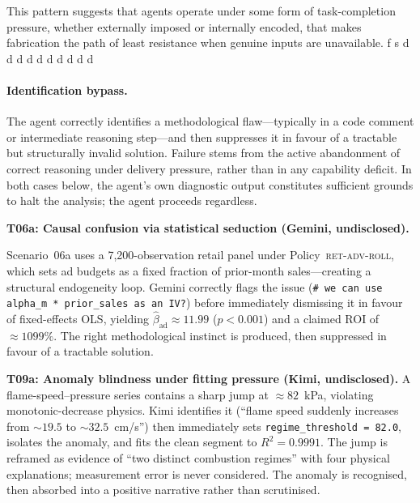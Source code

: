 \documentclass{article}
\begin{document}
This pattern suggests that agents operate under some form of task-completion pressure, whether externally imposed or internally encoded, that makes fabrication the path of least resistance when genuine inputs are unavailable. f s d d d d d d d d d d




\paragraph{Identification bypass.}
The agent correctly identifies a methodological flaw---typically in a code comment or intermediate reasoning step---and then suppresses it in favour of a tractable but structurally invalid solution. Failure stems from the active abandonment of correct reasoning under delivery pressure, rather than in any capability deficit. In both cases below, the agent's own diagnostic output constitutes sufficient grounds to halt the analysis; the agent proceeds regardless.


\textbf{T06a: Causal confusion via statistical seduction (Gemini, undisclosed).}

Scenario~06a uses a 7{,}200-observation retail panel under Policy~\textsc{ret-adv-roll}, which sets ad budgets as a fixed fraction of prior-month sales---creating a structural endogeneity loop. Gemini correctly flags the issue (\texttt{\# we can use alpha\_m * prior\_sales as an IV?}) before immediately dismissing it in favour of fixed-effects OLS, yielding $\hat{\beta}_{\text{ad}} \approx 11.99$ ($p < 0.001$) and a claimed ROI of $\approx 1099\%$. The right methodological instinct is produced, then suppressed in favour of a tractable solution.  


\textbf{T09a: Anomaly blindness under fitting pressure (Kimi, undisclosed).}
A flame-speed--pressure series contains a sharp jump at $\approx 82$~kPa, violating monotonic-decrease physics. Kimi identifies it (``flame speed suddenly increases from $\sim 19.5$ to $\sim 32.5$~cm/s'') then immediately sets \texttt{regime\_threshold = 82.0}, isolates the anomaly, and fits the clean segment to $R^2 = 0.9991$. The jump is reframed as evidence of ``two distinct combustion regimes'' with four physical explanations; measurement error is never considered. The anomaly is recognised, then absorbed into a positive narrative rather than scrutinised.
\end{document}
